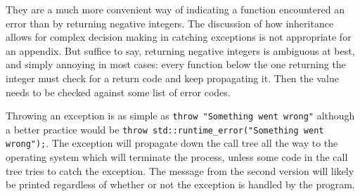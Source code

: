 \documentclass[10pt,a4paper]{book}
\begin{document}
They are a much more convenient way of indicating a function encountered an error than by returning negative integers. The discussion of how inheritance allows for complex decision making in catching exceptions is not appropriate for an appendix. But suffice to say, returning negative integers is ambiguous at best, and simply annoying in most cases: every function below the one returning the integer must check for a return code and keep propagating it. Then the value needs to be checked against some list of error codes.

Throwing an exception is as simple as \Verb`throw "Something went wrong"` although a better practice would be \Verb`throw std::runtime_error("Something went wrong");`. The exception will propagate down the call tree all the way to the operating system which will terminate the process, unless some code in the call tree tries to catch the exception. The message from the second version will likely be printed regardless of whether or not the exception is handled by the program.
\end{document}
